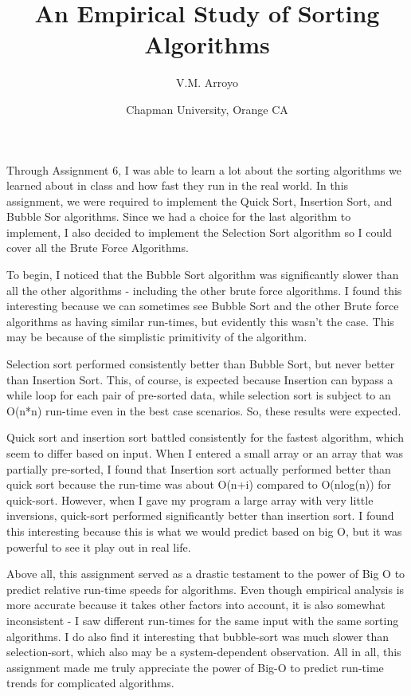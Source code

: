 \documentclass{article}
\title{An Empirical Study of Sorting Algorithms}
\author{V.M. Arroyo}
\date{Chapman University, Orange CA}
\begin{document}
\maketitle

\begin{multicols}{2}

Through Assignment 6, I was able to learn a lot about the sorting algorithms we learned about in class and how fast they run in the real world. In this assignment, we were required to implement the Quick Sort, Insertion Sort, and Bubble Sor algorithms. Since we had a choice for the last algorithm to implement, I also decided to implement the Selection Sort algorithm so I could cover all the Brute Force Algorithms.

To begin, I noticed that the Bubble Sort algorithm was significantly slower than all the other algorithms - including the other brute force algorithms. I found this interesting because we can sometimes see Bubble Sort and the other Brute force algorithms as having similar run-times, but evidently this wasn't the case. This may be because of the simplistic primitivity of the algorithm.

Selection sort performed consistently better than Bubble Sort, but never better than Insertion Sort. This, of course, is expected because Insertion can bypass a while loop for each pair of pre-sorted data, while selection sort is subject to an O(n*n) run-time even in the best case scenarios. So, these results were expected.

Quick sort and insertion sort battled consistently for the fastest algorithm, which seem to differ based on input. When I entered a small array or an array that was partially pre-sorted, I found that Insertion sort actually performed better than quick sort because the run-time was about O(n+i) compared to O(nlog(n)) for quick-sort. However, when I gave my program a large array with very little inversions, quick-sort performed significantly better than insertion sort. I found this interesting because this is what we would predict based on big O, but it was powerful to see it play out in real life.

Above all, this assignment served as a drastic testament to the power of Big O to predict relative run-time speeds for algorithms. Even though empirical analysis is more accurate because it takes other factors into account, it is also somewhat inconsistent - I saw different run-times for the same input with the same sorting algorithms. I do also find it interesting that bubble-sort was much slower than selection-sort, which also may be a system-dependent observation. All in all, this assignment made me truly appreciate the power of Big-O to predict run-time trends for complicated algorithms.
\end{multicols}
\end{document}
